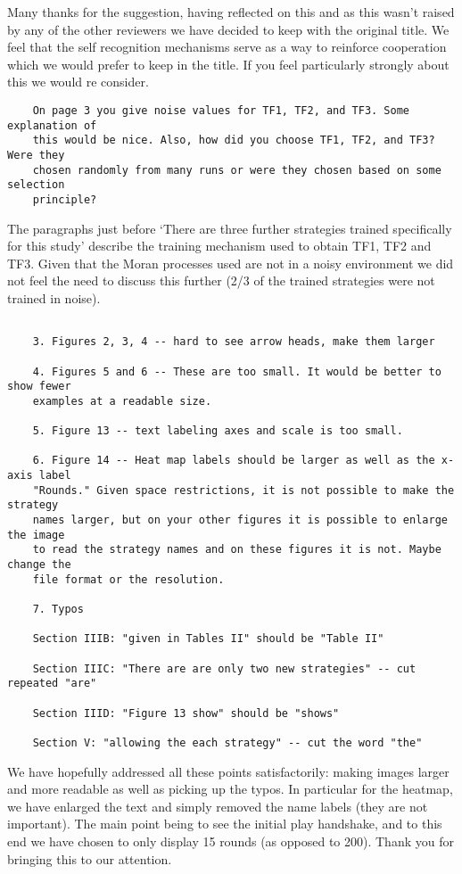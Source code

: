 \documentclass[a4]{article}
\begin{document}
Many thanks for the suggestion, having reflected on this and as this wasn't
raised by any of the other reviewers we have decided to keep with the original
title. We feel that the self recognition mechanisms serve as a way to reinforce
cooperation which we would prefer to keep in the title. If you feel particularly
strongly about this we would re consider.

\begin{verbatim}
    On page 3 you give noise values for TF1, TF2, and TF3. Some explanation of
    this would be nice. Also, how did you choose TF1, TF2, and TF3? Were they
    chosen randomly from many runs or were they chosen based on some selection
    principle?
\end{verbatim}

The paragraphs just before `There are three further strategies trained
specifically for this
study' describe the training mechanism used to obtain TF1, TF2 and TF3.  Given
that the Moran processes used are not in a noisy environment we did not feel the
need to discuss this further (2/3 of the trained strategies were not trained in
noise).

\begin{verbatim}

    3. Figures 2, 3, 4 -- hard to see arrow heads, make them larger

    4. Figures 5 and 6 -- These are too small. It would be better to show fewer
    examples at a readable size.

    5. Figure 13 -- text labeling axes and scale is too small.

    6. Figure 14 -- Heat map labels should be larger as well as the x-axis label
    "Rounds." Given space restrictions, it is not possible to make the strategy
    names larger, but on your other figures it is possible to enlarge the image
    to read the strategy names and on these figures it is not. Maybe change the
    file format or the resolution.

    7. Typos 

    Section IIIB: "given in Tables II" should be "Table II"

    Section IIIC: "There are are only two new strategies" -- cut repeated "are"

    Section IIID: "Figure 13 show" should be "shows"

    Section V: "allowing the each strategy" -- cut the word "the"
\end{verbatim}

We have hopefully addressed all these points satisfactorily: making images
larger and more readable as well as picking up the typos. 
In particular for the heatmap, we have enlarged the text and simply removed the
name labels (they are not important). The main point being to see the initial
play handshake, and to this end we have chosen to only display 15 rounds (as
opposed to 200).
Thank you for bringing this to our attention.
\end{document}
